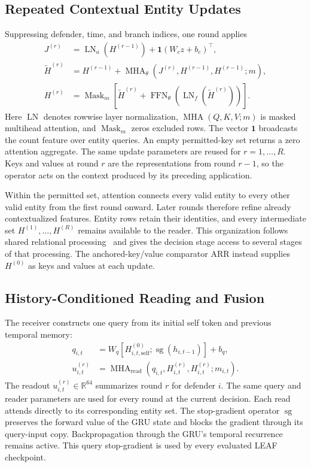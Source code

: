 \subsection{Repeated Contextual Entity Updates}
Suppressing defender, time, and branch indices, one round applies
\begin{align}
 J^{(r)}&=\operatorname{LN}_a(H^{(r-1)})
              +\mathbf1(W_cz+b_c)^\top,\nonumber\\
 \widetilde H^{(r)}&=H^{(r-1)}
       +\operatorname{MHA}_{\theta}(J^{(r)},H^{(r-1)},H^{(r-1)};m),\nonumber\\
 H^{(r)}&=\operatorname{Mask}_{m}\!\left[\widetilde H^{(r)}
       +\operatorname{FFN}_{\theta}
                  (\operatorname{LN}_f(\widetilde H^{(r)}))\right].
 \label{eq:loop}
\end{align}
Here $\operatorname{LN}$ denotes rowwise layer normalization, $\operatorname{MHA}(Q,K,V;m)$ is masked multihead attention, and $\operatorname{Mask}_m$ zeros excluded rows. The vector $\mathbf1$ broadcasts the count feature over entity queries. An empty permitted-key set returns a zero attention aggregate. The same update parameters are reused for $r=1,\ldots,R$. Keys and values at round $r$ are the representations from round $r-1$, so the operator acts on the context produced by its preceding application.

Within the permitted set, attention connects every valid entity to every other valid entity from the first round onward. Later rounds therefore refine already contextualized features. Entity rows retain their identities, and every intermediate set $H^{(1)},\ldots,H^{(R)}$ remains available to the reader. This organization follows shared relational processing~\cite{zambaldi2019relational,dehghani2019universal} and gives the decision stage access to several stages of that processing. The anchored-key/value comparator ARR instead supplies $H^{(0)}$ as keys and values at each update.

\subsection{History-Conditioned Reading and Fusion}
The receiver constructs one query from its initial self token and previous temporal memory:
\begin{align}
 q_{i,t}&=W_q[H^{(0)}_{i,t,\mathrm{self}};
                    \operatorname{sg}(h_{i,t-1})]+b_q,\nonumber\\
 u_{i,t}^{(r)}&=\operatorname{MHA}_{\mathrm{read}}
                  (q_{i,t},H_{i,t}^{(r)},H_{i,t}^{(r)};m_{i,t}).
 \label{eq:read}
\end{align}
The readout $u_{i,t}^{(r)}\in\mathbb R^{64}$ summarizes round $r$ for defender $i$. The same query and reader parameters are used for every round at the current decision. Each read attends directly to its corresponding entity set. The stop-gradient operator $\operatorname{sg}$ preserves the forward value of the GRU state and blocks the gradient through its query-input copy. Backpropagation through the GRU's temporal recurrence remains active. This query stop-gradient is used by every evaluated LEAF checkpoint.

